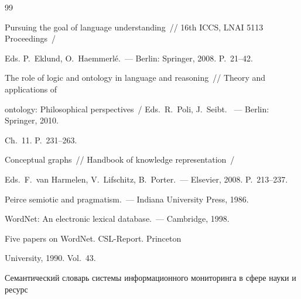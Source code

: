 {{\begin{thebibliography}{99}




Pursuing the goal of language understanding~/\!\!/ 16th ICCS, LNAI 5113 Proceedings~/ 


Eds. P.~Eklund, O.~Haemmerl\'{e}.~--- Berlin: Springer, 2008.  P.~21--42.









The role of logic and ontology in language and reasoning~// Theory and applications of 


ontology: Philosophical perspectives~/ Eds.\ R.~Poli, J.~Seibt. ~--- Berlin: Springer, 2010. 


Ch.~11. P.~231--263. 












Conceptual graphs~/\!\!/ Handbook of knowledge representation~/


Eds.\ F.~van Harmelen, V.~Lifschitz, B.~Porter.~--- Elsevier, 2008. P.~213--237. 









Peirce semiotic and pragmatism.~--- Indiana University Press, 1986.









WordNet: An electronic lexical database.~--- Cambridge, 1998. 







 Five papers on WordNet. CSL-Report.  Princeton 


University, 1990. Vol.~43.









Семантический словарь системы информационного мониторинга в сфере науки и ресурс 



\end{thebibliography}}}
